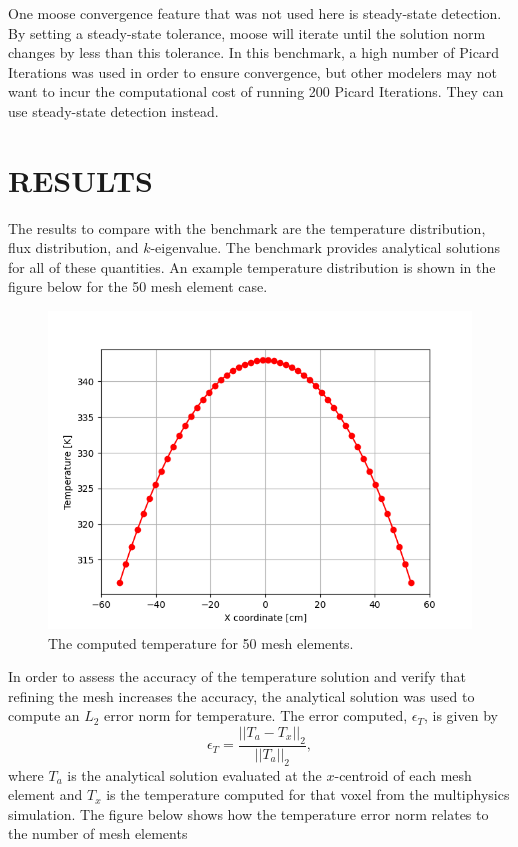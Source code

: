 \documentclass[letterpaper]{mc2023}
\begin{document}
One \gls{moose} convergence feature that was not used here is steady-state detection. By setting a steady-state tolerance, \gls{moose}
will iterate until the solution norm changes by less than this tolerance. In this benchmark, a high number of Picard Iterations was used
in order to ensure convergence, but other modelers may not want to incur the computational cost of running 200 Picard Iterations. They can
use steady-state detection instead.

\section{RESULTS}\label{sec:results}
The results to compare with the benchmark are the temperature distribution, flux distribution, and $k$-eigenvalue. The benchmark provides
analytical solutions for all of these quantities. An example temperature distribution is shown in the figure below for the 50 mesh element case.
\begin{figure}[H]
    \centering
    \includegraphics[width=0.55\linewidth]{figures/temp_50.png}
    \caption{The computed temperature for 50 mesh elements.}
    \label{fig:temp50}
\end{figure}
In order to assess the accuracy of the temperature solution and verify that refining the mesh increases the accuracy, the analytical solution
was used to compute an $L_{2}$ error norm for temperature. The error computed, $\epsilon_{T}$, is given by
\begin{equation}
    \epsilon_{T} = \frac{|| T_{a} - T_{x} ||_{2}}{|| T_{a} ||_{2}},
\end{equation}
where $T_{a}$ is the analytical solution evaluated at the $x$-centroid of each mesh element and $T_{x}$ is the temperature computed for that
voxel from the multiphysics simulation. The figure below shows how the temperature error norm relates to the number of mesh elements
\end{document}

